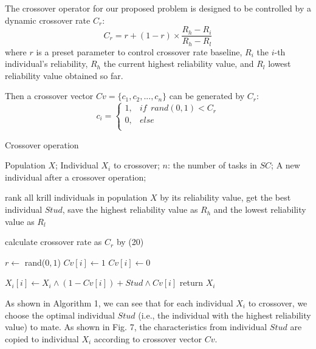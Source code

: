 \documentclass[journal]{IEEEtran}
\begin{document}
The crossover operator for our proposed problem is designed to be controlled by a dynamic crossover rate $C_{r}$:
\begin{equation}
C_{r} = r + (1-r) \times \frac{R_{h}-R_{i}}{R_{h}-R_{l}}
\end{equation}
where $r$ is a preset parameter to control crossover rate baseline, $R_{i}$ the $i$-th individual's reliability, $R_{h}$ the current highest reliability value, and $R_{l}$ lowest reliability value obtained so far.

Then a crossover vector $Cv = \{c_{1},c_{2},...,c_{n}\}$ can be generated by $C_{r}$:
\begin{equation}
c_{i}=
\begin{cases}
1,& if \ \ rand(0,1) < C_{r}\\
0,& else\\
\end{cases}
\end{equation}

\begin{algorithm}
\caption{Crossover operation}
\label{Crossover operation}
\begin{algorithmic}[1]

\REQUIRE Population $X$; Individual $X_i$ to crossover; $n$: the number of tasks in $SC$; 
\ENSURE A new individual after a crossover operation;

\STATE rank all krill individuals in population $X$ by its reliability value, get the best individual $Stud$, save the highest reliability value as $R_{h}$ and the lowest reliability value as $R_{l}$

\STATE calculate crossover rate as $C_{r}$ by (20)

\STATE $r \leftarrow$ rand($0,1$)
\STATE $Cv[i] \leftarrow 1$
\ELSE
\STATE $Cv[i] \leftarrow 0$
\ENDIF
\ENDFOR

\STATE $X_i[i] \leftarrow X_i \wedge  (1-Cv[i]) + Stud \wedge Cv[i]$ 
\ENDFOR
\STATE return $X_i$
\end{algorithmic}
\end{algorithm}

As shown in Algorithm 1, we can see that for each individual $X_i$ to crossover, we choose the optimal individual $Stud$ (i.e., the individual with the highest reliability value) to mate. As shown in Fig. 7, the characteristics from individual $Stud$ are copied to individual $X_i$ according to crossover vector $Cv$. 
\end{document}
